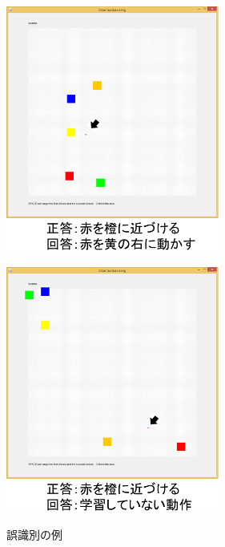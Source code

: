 \begin{figure}[h]
	\centering
	\begin{minipage}[t]{.47\textwidth}
		\centering
		\includegraphics[width=7cm]{figure4_a.png} \\ %
		\label{subfigure:failure1}    
	\end{minipage}
	\begin{minipage}[t]{.47\textwidth}
		\centering
		\includegraphics[width=7cm]{figure4_b.png} \\ %
		\label{subfigure:failure2}
	\end{minipage}
	\caption{誤識別の例}
	\label{figure:failure}
\end{figure}
\clearpage
